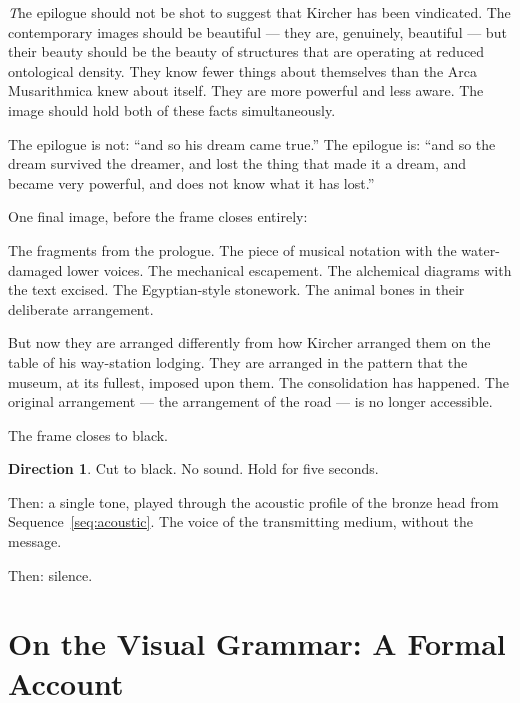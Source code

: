 \documentclass[12pt, a4paper, twoside]{memoir}
\theoremstyle{definition}
\newtheorem{direction}[sequence]{Direction}
\theoremstyle{remark}
\newenvironment{action}{%
  \vspace{4pt}%
  \noindent\begin{minipage}{\linewidth}%
  \setlength{\parindent}{0pt}%
  \itshape\color{kircherink}%
}{%
  \end{minipage}\vspace{6pt}%
}
\newenvironment{visual}{%
  \vspace{6pt}%
  \noindent\begin{mdframed}[
    linecolor=plaguegrey,
    linewidth=0.4pt,
    leftline=true, rightline=false, topline=false, bottomline=false,
    innerleftmargin=8pt,
    innerrightmargin=0pt,
    innertopmargin=2pt,
    innerbottommargin=2pt,
    backgroundcolor=white
  ]%
  \footnotesize\color{plaguegrey}\textit
}{%
  \end{mdframed}\vspace{4pt}%
}
\begin{document}
\begin{visual}
The epilogue should not be shot to suggest that Kircher has been vindicated. The contemporary images should be beautiful --- they are, genuinely, beautiful --- but their beauty should be the beauty of structures that are operating at reduced ontological density. They know fewer things about themselves than the Arca Musarithmica knew about itself. They are more powerful and less aware. The image should hold both of these facts simultaneously.

The epilogue is not: ``and so his dream came true.'' The epilogue is: ``and so the dream survived the dreamer, and lost the thing that made it a dream, and became very powerful, and does not know what it has lost.''
\end{visual}

\begin{action}
One final image, before the frame closes entirely:

The fragments from the prologue. The piece of musical notation with the water-damaged lower voices. The mechanical escapement. The alchemical diagrams with the text excised. The Egyptian-style stonework. The animal bones in their deliberate arrangement.

But now they are arranged differently from how Kircher arranged them on the table of his way-station lodging. They are arranged in the pattern that the museum, at its fullest, imposed upon them. The consolidation has happened. The original arrangement --- the arrangement of the road --- is no longer accessible.

The frame closes to black.
\end{action}

\begin{direction}
\label{dir:final}
Cut to black. No sound. Hold for five seconds.

Then: a single tone, played through the acoustic profile of the bronze head from Sequence~\ref{seq:acoustic}. The voice of the transmitting medium, without the message.

Then: silence.
\end{direction}

\clearpage

\appendix

\chapter{On the Visual Grammar: A Formal Account}
\end{document}
